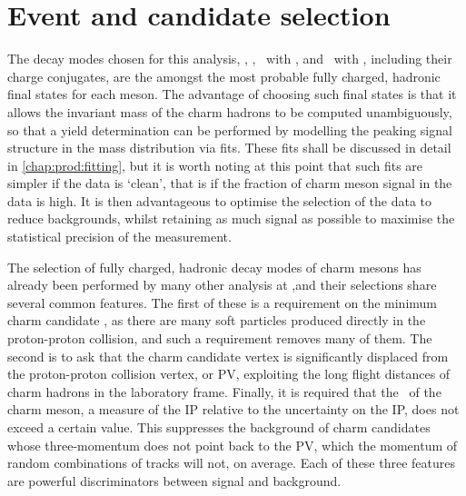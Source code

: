 \chapter{Event and candidate selection}
\label{chap:prod:sel}

The decay modes chosen for this analysis,
\DzToKpi, \DpToKpipi, \DspTophipi\ with \phiToKK, and \DstToDzpi\ with 
\DzToKpi, including their charge conjugates, are the amongst the most probable 
fully charged, hadronic final states for each meson.
The advantage of choosing such final states is that it allows the invariant 
mass of the charm hadrons to be computed unambiguously, so that a yield 
determination can be performed by modelling the peaking signal structure in the 
mass distribution via fits.
These fits shall be discussed in detail in \cref{chap:prod:fitting}, but it is 
worth noting at this point that such fits are simpler if the data is `clean', 
that is if the fraction of charm meson signal in the data is high.
It is then advantageous to optimise the selection of the data to reduce 
backgrounds, whilst retaining as much signal as possible to maximise the 
statistical precision of the measurement.

The selection of fully charged, hadronic decay modes of charm mesons has 
already been performed by many other analysis at \lhcb,\footnotemark and their 
selections share several common features.
The first of these is a requirement on the minimum charm candidate \pT, as 
there are many soft particles produced directly in the proton-proton collision, 
and such a requirement removes many of them.
The second is to ask that the charm candidate vertex is significantly displaced 
from the proton-proton collision vertex, or \ac{PV}, exploiting the long flight 
distances of charm hadrons in the laboratory frame.
Finally, it is required that the \ipchisq\ of the charm meson, a measure of the 
\acf{IP} relative to the uncertainty on the \ac{IP}, does not exceed a certain 
value.
This suppresses the background of charm candidates whose three-momentum does 
not point back to the \ac{PV}, which the momentum of random combinations of 
tracks will not, on average.
Each of these three features are powerful discriminators between signal and 
background.


